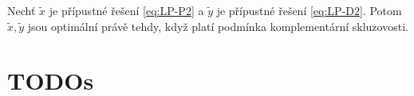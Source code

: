 \begin{vt}
    Nechť $\tilde{x}$ je přípustné řešení \ref{eq:LP-P2} a $\tilde{y}$ je přípustné řešení \ref{eq:LP-D2}. Potom $\tilde{x}, \tilde{y}$ jsou optimální právě tehdy, když platí podmínka komplementární skluzovosti.
\end{vt}

\section*{TODOs}

